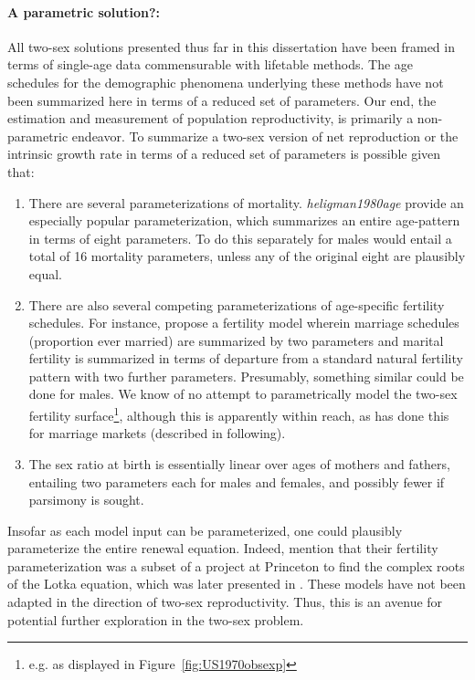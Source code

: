 \paragraph{A parametric solution?: } All two-sex solutions presented thus far in
this dissertation have been framed in terms of single-age data commensurable with lifetable
methods. The age schedules for the demographic phenomena underlying these
methods have not been summarized here in terms of a reduced set of parameters.
Our end, the estimation and measurement of population reproductivity, is primarily 
a non-parametric endeavor. To summarize a two-sex version of net reproduction or
the intrinsic growth rate in terms of a reduced set of parameters is
possible given that: 
\begin{enumerate}
  \item There are several parameterizations of mortality.
  \textit{heligman1980age} provide an especially popular parameterization, which 
  summarizes an entire age-pattern in terms of eight parameters. To do this
  separately for males would entail a total of 16 mortality parameters, unless
  any of the original eight are plausibly equal.
  \item There are also several competing parameterizations of age-specific
  fertility schedules. For instance, \citet{coale1974model} propose a fertility
  model wherein marriage schedules (proportion ever married) are summarized by
  two parameters and marital fertility is summarized in terms of departure from
  a standard natural fertility pattern with two further parameters. Presumably,
  something similar could be done for males. We know of no attempt to
  parametrically model the two-sex fertility surface\footnote{e.g. as displayed
  in Figure~\ref{fig:US1970obsexp}}, although this is apparently within reach,
  as \citet{marriage1981warren,
sanderson1983two} has done this for marriage markets (described in following).
  \item The sex ratio at birth is essentially linear over ages of mothers and
  fathers, entailing two parameters each for males and females, and possibly
  fewer if parsimony is sought.
\end{enumerate}

Insofar as each model input can be parameterized, one could plausibly
parameterize the entire renewal equation. Indeed, \citet{coale1974model} mention
that their fertility parameterization was a subset of a project at
Princeton to find the complex roots of the Lotka equation, which
was later presented in \citet{james1977determinants}. These models have not 
been adapted in the direction of two-sex reproductivity. Thus, this is an avenue
for potential further exploration in the two-sex problem.

